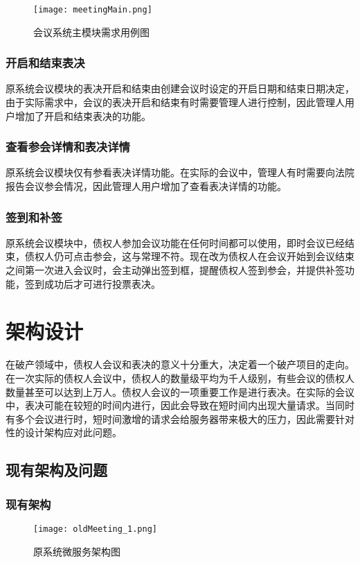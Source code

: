 \begin{figure}[!htp]
  \centering
  \texttt{[image: meetingMain.png]}
  \caption[主模块]
    {会议系统主模块需求用例图}
 \label{fig:meetingMain}
\end{figure}

\subsubsection{开启和结束表决}
原系统会议模块的表决开启和结束由创建会议时设定的开启日期和结束日期决定，由于实际需求中，会议的表决开启和结束有时需要管理人进行控制，因此管理人用户增加了开启和结束表决的功能。

\subsubsection{查看参会详情和表决详情}
原系统会议模块仅有参看表决详情功能。在实际的会议中，管理人有时需要向法院报告会议参会情况，因此管理人用户增加了查看表决详情的功能。

\subsubsection{签到和补签}
原系统会议模块中，债权人参加会议功能在任何时间都可以使用，即时会议已经结束，债权人仍可点击参会，这与常理不符。现在改为债权人在会议开始到会议结束之间第一次进入会议时，会主动弹出签到框，提醒债权人签到参会，并提供补签功能，签到成功后才可进行投票表决。

\section{架构设计}
在破产领域中，债权人会议和表决的意义十分重大，决定着一个破产项目的走向。在一次实际的债权人会议中，债权人的数量级平均为千人级别，有些会议的债权人数量甚至可以达到上万人。债权人会议的一项重要工作是进行表决。在实际的会议中，表决可能在较短的时间内进行，因此会导致在短时间内出现大量请求。当同时有多个会议进行时，短时间激增的请求会给服务器带来极大的压力，因此需要针对性的设计架构应对此问题。

\subsection{现有架构及问题}

\subsubsection{现有架构}
\begin{figure}[!htp]
  \centering
  \texttt{[image: oldMeeting\_1.png]}
  \caption[原微服务]
    {原系统微服务架构图\cite{Wang2021}}
 \label{fig:oldMeeting_1}
\end{figure}

